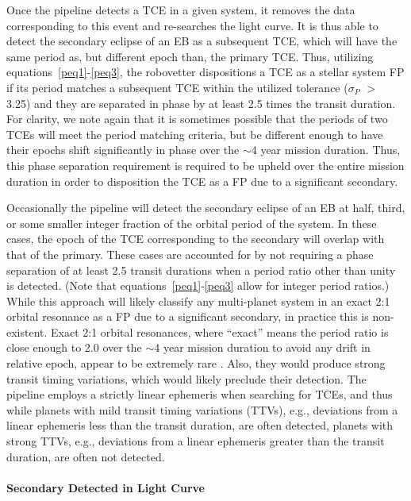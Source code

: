 Once the \kepler{} pipeline detects a TCE in a given system, it removes the data corresponding to this event and re-searches the light curve. It is thus able to detect the secondary eclipse of an EB as a subsequent TCE, which will have the same period as, but different epoch than, the primary TCE. Thus, utilizing equations~\ref{peq1}-\ref{peq3}, the robovetter dispositions a TCE as a stellar system FP if its period matches a subsequent TCE within the utilized tolerance ($\sigma_{P}$ $>$ 3.25) and they are separated in phase by at least 2.5 times the transit duration. For clarity, we note again that it is sometimes possible that the periods of two TCEs will meet the period matching criteria, but be different enough to have their epochs shift significantly in phase over the $\sim$4 year mission duration. Thus, this phase separation requirement is required to be upheld over the entire mission duration in order to disposition the TCE as a FP due to a significant secondary.

Occasionally the \kepler{} pipeline will detect the secondary eclipse of an EB at half, third, or some smaller integer fraction of the orbital period of the system. In these cases, the epoch of the TCE corresponding to the secondary will overlap with that of the primary. These cases are accounted for by not requiring a phase separation of at least 2.5 transit durations when a period ratio other than unity is detected. (Note that equations~\ref{peq1}-\ref{peq3} allow for integer period ratios.) While this approach will likely classify any multi-planet system in an exact 2:1 orbital resonance as a FP due to a significant secondary, in practice this is non-existent. Exact 2:1 orbital resonances, where ``exact'' means the period ratio is close enough to 2.0 over the $\sim$4 year mission duration to avoid any drift in relative epoch, appear to be extremely rare \citep{Fabrycky2014}. Also, they would produce strong transit timing variations, which would likely preclude their detection. The \kepler{} pipeline employs a strictly linear ephemeris when searching for TCEs, and thus while planets with mild transit timing variations (TTVs), e.g., deviations from a linear ephemeris less than the transit duration, are often detected, planets with strong TTVs, e.g., deviations from a linear ephemeris greater than the transit duration, are often not detected.



\paragraph{Secondary Detected in Light Curve}
\label{secdetectsec}

